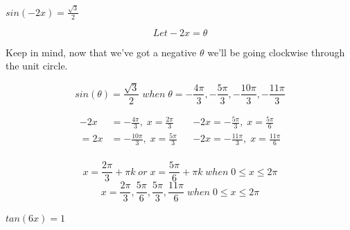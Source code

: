\documentclass[10pt,letterpaper]{amspset}
\begin{document}
\begin{problem}[3]
    $sin(-2x) = \frac{\sqrt{3}}{2}$
\end{problem}

\begin{solution}
    \[Let -2x = \theta\] 
    
    Keep in mind, now that we've got a negative $\theta$ we'll be going clockwise through the unit circle. 
    
    \[sin(\theta) = \frac{\sqrt{3}}{2} \; when \; \theta = -\frac{4\pi}{3}, -\frac{5\pi}{3}, -\frac{10\pi}{3}, -\frac{11\pi}{3} \]
    
    \begin{align}
        -2x &= -\frac{4\pi}{3}, \; x = \frac{2\pi}{3} && -2x = -\frac{5\pi}{3}, \; x = \frac{5\pi}{6}\\[+3mm]
        =2x &= -\frac{10\pi}{3}, \; x = \frac{5\pi}{3} && -2x = -\frac{11\pi}{3}, \; x = \frac{11\pi}{6}\\
    \end{align}
    
\[\boxed{ x = \frac{2\pi}{3} + \pi k \; or \; x = \frac{5\pi}{6} + \pi k \; when \; 0 \leq x \leq 2\pi }\]
\[\boxed{ x = \frac{2\pi}{3}, \frac{5\pi}{6}, \frac{5\pi}{3}, \frac{11\pi}{6} \; when \; 0 \leq x \leq 2\pi  }\]
\end{solution}


\pagebreak


\begin{problem}[4]
    $tan(6x) = 1$
\end{problem}
\end{document}
